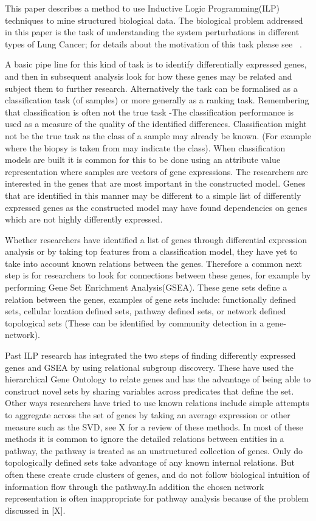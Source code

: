 \documentclass[runningheads,a4paper]{llncs}
\begin{document}
This paper describes a method to use Inductive Logic Programming(ILP) techniques to mine structured biological data. The biological problem addressed in this paper is the task of  understanding the system perturbations in different types of Lung Cancer; for details about the motivation of this task please see  ~\cite{Nobody06}.

A basic pipe line for this kind of task is to identify differentially expressed genes, and then in subsequent analysis look for how these genes may be related and subject them to further research.  Alternatively the task can be formalised as a classification task (of samples) or more generally as a ranking task. Remembering that classification is often not the true task -The classification performance is used as a measure of the quality of the identified differences. Classification might not be the true task as the class of a sample may already be known. (For example where the biopsy is taken from may indicate the class). When classification models are built it is common for this to be done using an attribute value representation where samples are vectors of gene expressions. The researchers are interested in the genes that are most important in the constructed model. Genes that are identified in this manner may be  different to a simple list of differently expressed genes as the constructed model may have found dependencies on genes which are not highly differently expressed. 

Whether researchers have identified a list of genes through differential expression analysis or by taking top features from a classification model, they have yet to take into account known relations between the genes. Therefore  a common next step is for researchers to look for connections between these genes, for example by performing Gene Set Enrichment Analysis(GSEA). These gene sets define a relation between the genes,  examples of gene sets include: functionally defined sets, cellular location defined sets, pathway defined sets, or network defined topological sets (These can be identified by community detection in a gene-network).

Past ILP research has integrated the two steps of finding differently expressed genes and GSEA by using relational subgroup discovery. These have used the hierarchical Gene Ontology to relate genes and has the advantage of being able to construct novel sets by sharing variables across predicates that define the set. Other ways researchers have tried to use known relations include simple attempts to aggregate across the set of genes by taking an average expression or other measure such as the SVD, see X for a review of these methods.  In most of these methods it is common to ignore the detailed relations between entities in a pathway, the pathway is treated as an unstructured collection of genes. Only do topologically defined sets take advantage of any known internal relations. But often these create crude clusters of genes, and do not follow biological intuition of information flow through the pathway.In addition the chosen network representation is often inappropriate for pathway analysis because of the problem discussed in [X].
\end{document}
